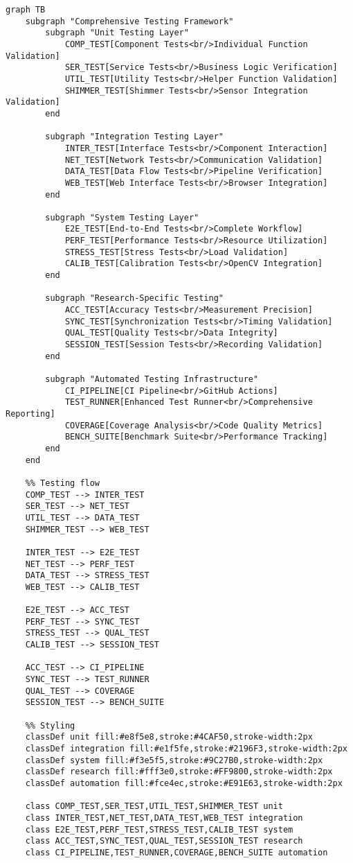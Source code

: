 \documentclass[11pt,a4paper]{article}
\begin{document}
\begin{verbatim}
graph TB
    subgraph "Comprehensive Testing Framework"
        subgraph "Unit Testing Layer"
            COMP_TEST[Component Tests<br/>Individual Function Validation]
            SER_TEST[Service Tests<br/>Business Logic Verification]
            UTIL_TEST[Utility Tests<br/>Helper Function Validation]
            SHIMMER_TEST[Shimmer Tests<br/>Sensor Integration Validation]
        end

        subgraph "Integration Testing Layer"
            INTER_TEST[Interface Tests<br/>Component Interaction]
            NET_TEST[Network Tests<br/>Communication Validation]
            DATA_TEST[Data Flow Tests<br/>Pipeline Verification]
            WEB_TEST[Web Interface Tests<br/>Browser Integration]
        end

        subgraph "System Testing Layer"
            E2E_TEST[End-to-End Tests<br/>Complete Workflow]
            PERF_TEST[Performance Tests<br/>Resource Utilization]
            STRESS_TEST[Stress Tests<br/>Load Validation]
            CALIB_TEST[Calibration Tests<br/>OpenCV Integration]
        end

        subgraph "Research-Specific Testing"
            ACC_TEST[Accuracy Tests<br/>Measurement Precision]
            SYNC_TEST[Synchronization Tests<br/>Timing Validation]
            QUAL_TEST[Quality Tests<br/>Data Integrity]
            SESSION_TEST[Session Tests<br/>Recording Validation]
        end

        subgraph "Automated Testing Infrastructure"
            CI_PIPELINE[CI Pipeline<br/>GitHub Actions]
            TEST_RUNNER[Enhanced Test Runner<br/>Comprehensive Reporting]
            COVERAGE[Coverage Analysis<br/>Code Quality Metrics]
            BENCH_SUITE[Benchmark Suite<br/>Performance Tracking]
        end
    end

    %% Testing flow
    COMP_TEST --> INTER_TEST
    SER_TEST --> NET_TEST
    UTIL_TEST --> DATA_TEST
    SHIMMER_TEST --> WEB_TEST

    INTER_TEST --> E2E_TEST
    NET_TEST --> PERF_TEST
    DATA_TEST --> STRESS_TEST
    WEB_TEST --> CALIB_TEST

    E2E_TEST --> ACC_TEST
    PERF_TEST --> SYNC_TEST
    STRESS_TEST --> QUAL_TEST
    CALIB_TEST --> SESSION_TEST

    ACC_TEST --> CI_PIPELINE
    SYNC_TEST --> TEST_RUNNER
    QUAL_TEST --> COVERAGE
    SESSION_TEST --> BENCH_SUITE

    %% Styling
    classDef unit fill:#e8f5e8,stroke:#4CAF50,stroke-width:2px
    classDef integration fill:#e1f5fe,stroke:#2196F3,stroke-width:2px
    classDef system fill:#f3e5f5,stroke:#9C27B0,stroke-width:2px
    classDef research fill:#fff3e0,stroke:#FF9800,stroke-width:2px
    classDef automation fill:#fce4ec,stroke:#E91E63,stroke-width:2px

    class COMP_TEST,SER_TEST,UTIL_TEST,SHIMMER_TEST unit
    class INTER_TEST,NET_TEST,DATA_TEST,WEB_TEST integration
    class E2E_TEST,PERF_TEST,STRESS_TEST,CALIB_TEST system
    class ACC_TEST,SYNC_TEST,QUAL_TEST,SESSION_TEST research
    class CI_PIPELINE,TEST_RUNNER,COVERAGE,BENCH_SUITE automation
\end{verbatim}
\end{document}
